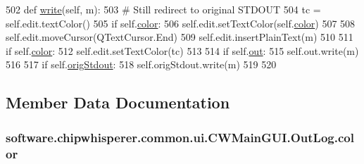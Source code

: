 \begin{DoxyCode}
502     \textcolor{keyword}{def }\hyperlink{classsoftware_1_1chipwhisperer_1_1common_1_1ui_1_1CWMainGUI_1_1OutLog_a9ce9fbfa97b20e49bf86854060e8cdfc}{write}(self, m):
503         \textcolor{comment}{# Still redirect to original STDOUT}
504         tc = self.edit.textColor()
505         \textcolor{keywordflow}{if} self.\hyperlink{classsoftware_1_1chipwhisperer_1_1common_1_1ui_1_1CWMainGUI_1_1OutLog_a1afed4aff3a7765b8d8609cff5556d55}{color}:
506             self.edit.setTextColor(self.\hyperlink{classsoftware_1_1chipwhisperer_1_1common_1_1ui_1_1CWMainGUI_1_1OutLog_a1afed4aff3a7765b8d8609cff5556d55}{color})
507 
508         self.edit.moveCursor(QTextCursor.End)
509         self.edit.insertPlainText(m)
510 
511         \textcolor{keywordflow}{if} self.\hyperlink{classsoftware_1_1chipwhisperer_1_1common_1_1ui_1_1CWMainGUI_1_1OutLog_a1afed4aff3a7765b8d8609cff5556d55}{color}:
512             self.edit.setTextColor(tc)
513 
514         \textcolor{keywordflow}{if} self.\hyperlink{classsoftware_1_1chipwhisperer_1_1common_1_1ui_1_1CWMainGUI_1_1OutLog_a74d31e7b8063bd62bff3aafa515f39ff}{out}:
515             self.out.write(m)
516 
517         \textcolor{keywordflow}{if} self.\hyperlink{classsoftware_1_1chipwhisperer_1_1common_1_1ui_1_1CWMainGUI_1_1OutLog_a5b854f0c7fb8f98692a348b3055f7078}{origStdout}:
518             self.origStdout.write(m)
519 
520 
\end{DoxyCode}


\subsection{Member Data Documentation}
\hypertarget{classsoftware_1_1chipwhisperer_1_1common_1_1ui_1_1CWMainGUI_1_1OutLog_a1afed4aff3a7765b8d8609cff5556d55}{}
\subsubsection[{color}]{\setlength{\rightskip}{0pt plus 5cm}software.\+chipwhisperer.\+common.\+ui.\+C\+W\+Main\+G\+U\+I.\+Out\+Log.\+color}\label{classsoftware_1_1chipwhisperer_1_1common_1_1ui_1_1CWMainGUI_1_1OutLog_a1afed4aff3a7765b8d8609cff5556d55}


